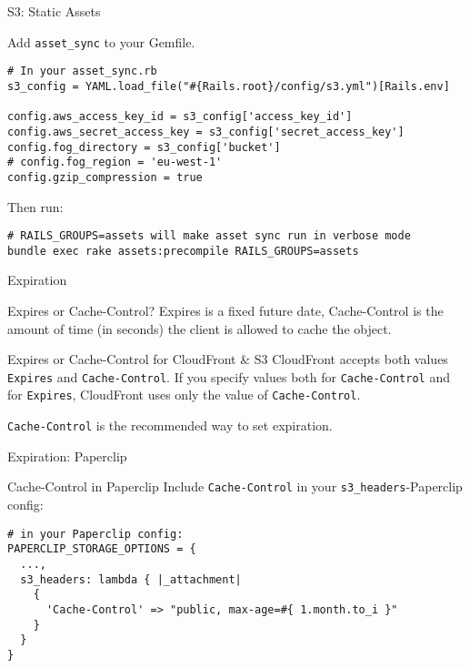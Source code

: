 \documentclass{beamer}
\begin{document}
\begin{frame}[fragile]{S3: Static Assets}

Add \lstinline{asset_sync} to your Gemfile.

\begin{lstlisting}
# In your asset_sync.rb
s3_config = YAML.load_file("#{Rails.root}/config/s3.yml")[Rails.env]

config.aws_access_key_id = s3_config['access_key_id']
config.aws_secret_access_key = s3_config['secret_access_key']
config.fog_directory = s3_config['bucket']
# config.fog_region = 'eu-west-1'
config.gzip_compression = true
\end{lstlisting}

Then run:

\begin{lstlisting}
# RAILS_GROUPS=assets will make asset sync run in verbose mode
bundle exec rake assets:precompile RAILS_GROUPS=assets
\end{lstlisting}
\end{frame}


\begin{frame}[fragile]{Expiration}
\begin{block}{Expires or Cache-Control?}
Expires is a fixed future date, Cache-Control is the amount of time (in seconds) the client is allowed to cache the object.
\end{block}
\begin{block}{Expires or Cache-Control for CloudFront \& S3}
CloudFront accepts both values \lstinline{Expires} and \lstinline{Cache-Control}. If you specify values both for \lstinline{Cache-Control} and for \lstinline{Expires}, CloudFront uses only the value of \lstinline{Cache-Control}.

\lstinline{Cache-Control} is the recommended way to set expiration.
\end{block}
\end{frame}


\begin{frame}[fragile]{Expiration: Paperclip}
\begin{block}{Cache-Control in Paperclip}
Include \lstinline{Cache-Control} in your \lstinline{s3_headers}-Paperclip config:
\end{block}
\begin{lstlisting}
# in your Paperclip config:
PAPERCLIP_STORAGE_OPTIONS = {
  ...,
  s3_headers: lambda { |_attachment|
    {
      'Cache-Control' => "public, max-age=#{ 1.month.to_i }"
    }
  }
}
\end{lstlisting}
\end{frame}
\end{document}
